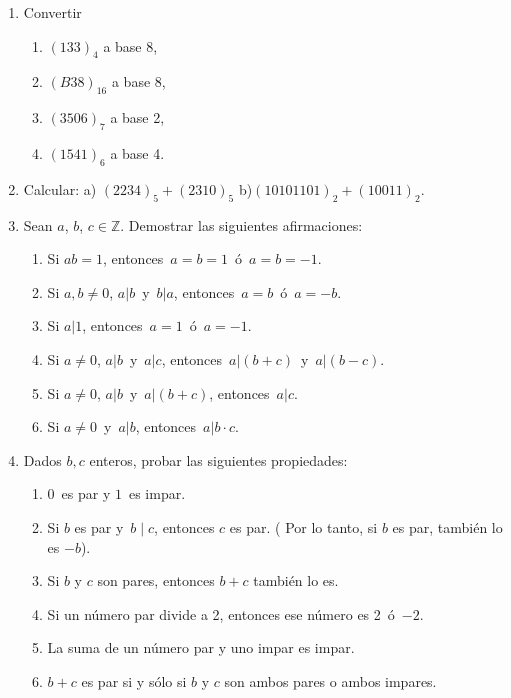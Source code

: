 \documentclass[12pt,spanish,makeidx]{amsbook}
\begin{document}
\begin{enumerate}
\smallskip

\item Convertir
\begin{multicols}{2}
\begin{enumerate}
	\item  $(133)_4$ a base 8,
	\item  $(B38)_{16}$ a base 8,
	\item  $(3506)_7$ a base 2,
	\item  $(1541)_6$ a base 4.
\end{enumerate}
\end{multicols}

\smallskip

\item Calcular: a) $(2234)_5+(2310)_5$ \qquad \qquad b)$(10101101)_2+(10011)_2$.

\smallskip

\item Sean $a$, $b$, $c \in {\mathbb Z}$. Demostrar las siguientes afirmaciones:
  \begin{enumerate}
  \item Si $ab=1$, entonces \,$a=b=1$\, \'o \,$a=b=-1$.
  \item Si $a,b \neq 0$,  $a| b$\, y \,$b | a$, entonces \,$a=b$\, \'o \,$a=-b$.
  \item Si $a | 1$, entonces \,$a=1$\, \'o \,$a=-1$.
  \item Si $a \neq 0$, $a | b$\, y \,$a | c$, entonces \,$a | (b+c)$\, y \,$a | (b-c)$.
  \item Si $a \neq 0$, $a | b$\, y \,$a | (b+c)$, entonces \,$a | c$.
  \item Si $a \neq 0$\, y \,$a | b$, entonces \,$a| b\cdot c$.
  \end{enumerate}

\smallskip

\item Dados $b,c$ enteros, probar las siguientes propiedades:
  \begin{enumerate}
  \item  $0$\, es par y $1$\, es impar.
  \item  Si $b$ es par y \,$b \mid c$, entonces $c$ es par.  ( Por lo tanto, si $b$ es par, tambi\'en lo es $-b$).
  \item  Si $b$ y $c$ son pares, entonces $b+c$ tambi\'en lo es. %
  \item  Si un n\'umero par divide a 2, entonces ese n\'umero es 2\, \'o \,$-2$.
  \item  La suma de un n\'umero par y uno impar es impar.
  \item $b + c$ es par si y  sólo si $b$ y $c$ son ambos pares o ambos impares.
\end{enumerate}


\end{enumerate}
\end{document}
